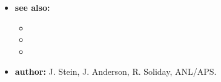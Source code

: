 \begin{itemize}
\begin{itemize}
    (default {\tt 482}).
  \item {\tt -ydim {\em value}} --- Number of pixels in the vertical dimension
    (default {\tt 512}).
  \item {\tt -xmin {\em value}} --- Minimum x value for the image data (default 0).
  \item {\tt -xmax {\em value}} --- Maximum x value for the image data. If not given
    the spacing is determined from {\tt -xdim}.
  \item {\tt -ymin {\em value}} --- Minimum y value for the image data (default 0).
  \item {\tt -ymax {\em value}} --- Maximum y value for the image data. If not given
    the spacing is determined from {\tt -ydim}.
  \item {\tt -debug {\em level}} --- Enable debugging output at the specified level.
  \item {\tt -help} or {\tt -?} --- Print command usage information.
  \end{itemize}
\item {\bf see also:}
  \begin{itemize}
  \item {}
  \item {}
  \item {}
  \end{itemize}
\item {\bf author:} J. Stein, J. Anderson, R. Soliday, ANL/APS.
\end{itemize}
